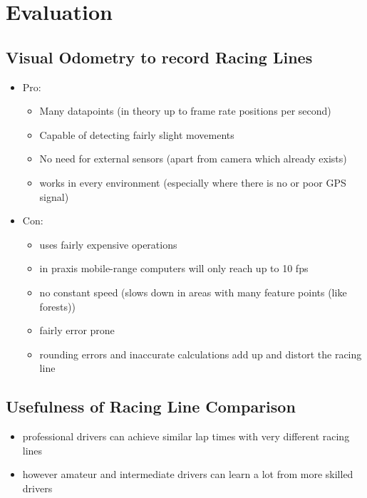 \section{Evaluation}
\label{sec:evaluation}

\subsection{Visual Odometry to record Racing Lines}

\begin{itemize}
\item Pro: 
  \begin{itemize}
  \item Many datapoints (in theory up to frame rate positions per second)
  \item Capable of detecting fairly slight movements
  \item No need for external sensors (apart from camera which already exists)
  \item works in every environment (especially where there is no or poor GPS signal)
  \end{itemize}

\item Con:
  \begin{itemize}
  \item uses fairly expensive operations
  \item in praxis mobile-range computers will only reach up to 10 fps
  \item no constant speed (slows down in areas with many feature points (like forests))
  \item fairly error prone
  \item rounding errors and inaccurate calculations add up and distort the racing line
  \end{itemize}
\end{itemize}

\subsection{Usefulness of Racing Line Comparison}
\begin{itemize}
  \item professional drivers can achieve similar lap times with very different racing lines
  \item however amateur and intermediate drivers can learn a lot from more skilled drivers
\end{itemize}


\clearpage
